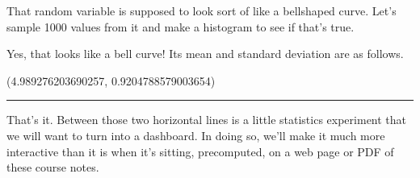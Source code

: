 \documentclass[letterpaper,10pt,english]{jupyterBook}
\begin{document}
\sphinxAtStartPar
That random variable is supposed to look sort of like a bell\sphinxhyphen{}shaped curve.  Let’s sample 1000 values from it and make a histogram to see if that’s true.

\begin{sphinxVerbatim}[commandchars=\\\{\}]
   
  \PYG{p}{[}      \PYG{p}{]}
   
\end{sphinxVerbatim}

\noindent{}

\sphinxAtStartPar
Yes, that looks like a bell curve!  Its mean and standard deviation are as follows.

\begin{sphinxVerbatim}[commandchars=\\\{\}]
     
\end{sphinxVerbatim}

\begin{sphinxVerbatim}[commandchars=\\\{\}]
(4.989276203690257, 0.9204788579003654)
\end{sphinxVerbatim}


\bigskip\hrule\bigskip


\sphinxAtStartPar
That’s it.  Between those two horizontal lines is a little statistics experiment that we will want to turn into a dashboard.  In doing so, we’ll make it much more interactive than it is when it’s sitting, pre\sphinxhyphen{}computed, on a web page or PDF of these course notes.
\end{document}
